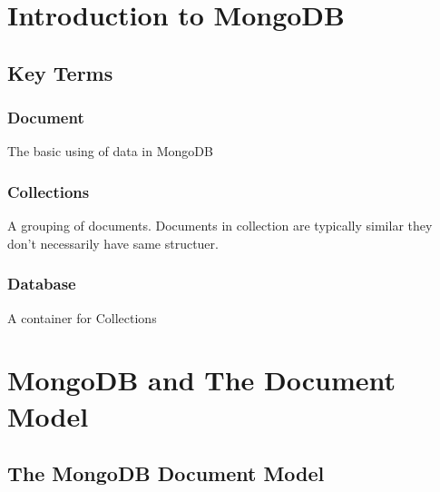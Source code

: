 \documentclass[../main.tex]{subfiles}
\begin{document}
\section{Introduction to MongoDB}
\subsection{Key Terms}
\subsubsection{Document}
The basic using of data in MongoDB
\subsubsection{Collections}
A grouping of documents. Documents in collection are typically similar they don't necessarily have same structuer.
\subsubsection{Database}
A container for Collections

\section{MongoDB and The Document Model}
\subsection{The MongoDB Document Model}



\end{document}
